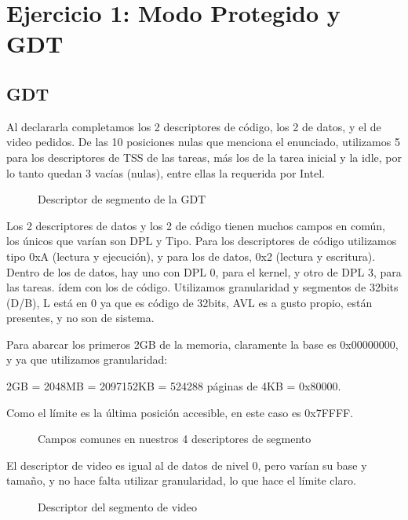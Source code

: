\documentclass[10pt, a4paper]{article}
\begin{document}
\section{Ejercicio 1: Modo Protegido y GDT}
\subsection{GDT}
Al declararla completamos los 2 descriptores de código, los 2 de datos, y el de video pedidos. De las 10 posiciones nulas que menciona el enunciado, utilizamos 5 para los descriptores de TSS de las tareas, más los de la tarea inicial y la idle, por lo tanto quedan 3 vacías (nulas), entre ellas la requerida por Intel.

		\begin{figure}[H]
	  		\centering
			\caption{Descriptor de segmento de la GDT}
			\label{fig:descriptorGDT}
		\end{figure}

Los 2 descriptores de datos y los 2 de código tienen muchos campos en común, los únicos que varían son DPL y Tipo. Para los descriptores de código utilizamos tipo 0xA (lectura y ejecución), y para los de datos, 0x2 (lectura y escritura). Dentro de los de datos, hay uno con DPL 0, para el kernel, y otro de DPL 3, para las tareas. ídem con los de código.
Utilizamos granularidad y segmentos de 32bits (D/B), L está en 0 ya que es código de 32bits, AVL es a gusto propio, están presentes, y no son de sistema.

Para abarcar los primeros 2GB de la memoria, claramente la base es 0x00000000, y ya que utilizamos granularidad:

\begin{center}
2GB = 2048MB = 2097152KB = 524288 páginas de 4KB = 0x80000.
\end{center}

Como el límite es la última posición accesible, en este caso es 0x7FFFF.
		\begin{figure}[H]
	  		\centering
			\caption{Campos comunes en nuestros 4 descriptores de segmento}
			\label{fig:descriptorGDTCamposComunes}
		\end{figure}
		
El descriptor de video es igual al de datos de nivel 0, pero varían su base y tamaño, y no hace falta utilizar granularidad, lo que hace el límite claro.
		\begin{figure}[H]
	  		\centering
			\caption{Descriptor del segmento de video}
			\label{fig:descriptorVideo}
		\end{figure}
		
\end{document}
